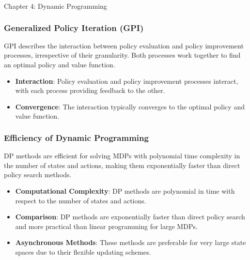 \begin{notes}{Chapter 4: Dynamic Programming}
\begin{highlight}
    \end{highlight}
    
    \subsubsection*{Generalized Policy Iteration (GPI)}
    
    GPI describes the interaction between policy evaluation and policy improvement processes, irrespective of their granularity. Both processes work together to find an optimal policy and value function.
    
    \begin{highlight}
    
        \begin{itemize}
            \item \textbf{Interaction}: Policy evaluation and policy improvement processes interact, with each process providing feedback to the other.
            \item \textbf{Convergence}: The interaction typically converges to the optimal policy and value function.
        \end{itemize}
    
    \end{highlight}
    
    \subsubsection*{Efficiency of Dynamic Programming}
    
    DP methods are efficient for solving MDPs with polynomial time complexity in the number of states and actions, making them exponentially faster than direct policy search methods.
    
    \begin{highlight}
    
        \begin{itemize}
            \item \textbf{Computational Complexity}: DP methods are polynomial in time with respect to the number of states and actions.
            \item \textbf{Comparison}: DP methods are exponentially faster than direct policy search and more practical than linear programming for large MDPs.
            \item \textbf{Asynchronous Methods}: These methods are preferable for very large state spaces due to their flexible updating schemes.
        \end{itemize}
    

\end{highlight}
\end{notes}
